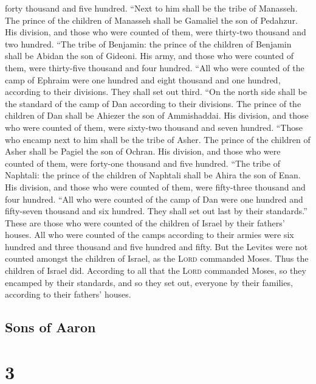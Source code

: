 forty thousand and five hundred.  ``Next to him shall be
the tribe of Manasseh. The prince of the children of Manasseh shall be
Gamaliel the son of Pedahzur.  His division, and those
who were counted of them, were thirty-two thousand and two hundred.
 ``The tribe of Benjamin: the prince of the children of
Benjamin shall be Abidan the son of Gideoni.  His army,
and those who were counted of them, were thirty-five thousand and four
hundred.  ``All who were counted of the camp of Ephraim
were one hundred and eight thousand and one hundred, according to their
divisions. They shall set out third.  ``On the north side
shall be the standard of the camp of Dan according to their divisions.
The prince of the children of Dan shall be Ahiezer the son of
Ammishaddai.  His division, and those who were counted of
them, were sixty-two thousand and seven hundred.  ``Those
who encamp next to him shall be the tribe of Asher. The prince of the
children of Asher shall be Pagiel the son of Ochran.  His
division, and those who were counted of them, were forty-one thousand
and five hundred.  ``The tribe of Naphtali: the prince of
the children of Naphtali shall be Ahira the son of Enan. 
His division, and those who were counted of them, were fifty-three
thousand and four hundred.  ``All who were counted of the
camp of Dan were one hundred and fifty-seven thousand and six hundred.
They shall set out last by their standards.''  These are
those who were counted of the children of Israel by their fathers'
houses. All who were counted of the camps according to their armies were
six hundred and three thousand and five hundred and fifty.
 But the Levites were not counted amongst the children of
Israel, as the \textsc{Lord} commanded Moses.  Thus the
children of Israel did. According to all that the \textsc{Lord}
commanded Moses, so they encamped by their standards, and so they set
out, everyone by their families, according to their fathers' houses.

\hypertarget{sons-of-aaron}{%
\subsection{Sons of Aaron}\label{sons-of-aaron}}

\hypertarget{section-2}{%
\section{3}\label{section-2}}

